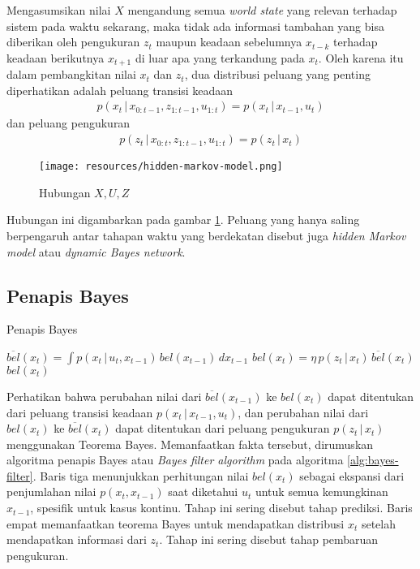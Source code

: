 Mengasumsikan nilai $X$ mengandung semua \textit{world state} yang relevan terhadap sistem pada waktu sekarang, maka tidak ada informasi tambahan yang bisa diberikan oleh pengukuran $z_t$ maupun keadaan sebelumnya $x_{t-k}$ terhadap keadaan berikutnya $x_{t+1}$ di luar apa yang terkandung pada $x_t$. Oleh karena itu dalam pembangkitan nilai $x_t$ dan $z_t$, dua distribusi peluang yang penting diperhatikan adalah peluang transisi keadaan
\begin{align}
    p(x_t \,|\, x_{0:t-1}, z_{1:t-1}, u_{1:t}) = p(x_t \,|\, x_{t-1}, u_t)
\end{align}
dan peluang pengukuran
\begin{align}
    p(z_t \,|\, x_{0:t}, z_{1:t-1}, u_{1:t}) = p(z_t \,|\, x_t)
\end{align}

\begin{figure}[h]
    \centering
    \texttt{[image: resources/hidden-markov-model.png]}
    \caption{Hubungan $X, U, Z$}
    \label{fig:hidden-markov-model}
\end{figure}

Hubungan ini digambarkan pada gambar \ref{fig:hidden-markov-model}. Peluang yang hanya saling berpengaruh antar tahapan waktu yang berdekatan disebut juga \textit{hidden Markov model} atau \textit{dynamic Bayes network}.

\subsection{Penapis Bayes}

\begin{algorithm}
    \caption{Penapis Bayes}
    \label{alg:bayes-filter}
    \begin{algorithmic}[1]
        \State $\overline{bel}(x_t) = \int p(x_t \,|\, u_t, x_{t-1})\, bel(x_{t-1})\, dx_{t-1}$
        \State $bel(x_t) = \eta\, p(z_t \,|\, x_t)\, \overline{bel}(x_t)$ 
        \EndFor
        \State \Return $bel(x_t)$
        \EndFunction
    \end{algorithmic}
\end{algorithm}

Perhatikan bahwa perubahan nilai dari $\overline{bel}(x_{t-1})$ ke $bel(x_t)$ dapat ditentukan dari peluang transisi keadaan $p(x_t \,|\, x_{t-1}, u_t)$, dan perubahan nilai dari $bel(x_t)$ ke $\overline{bel}(x_t)$ dapat ditentukan dari peluang pengukuran $p(z_t \,|\, x_t)$ menggunakan Teorema Bayes. Memanfaatkan fakta tersebut, dirumuskan algoritma penapis Bayes atau \textit{Bayes filter algorithm} pada algoritma \ref{alg:bayes-filter}. Baris tiga menunjukkan perhitungan nilai $bel(x_t)$ sebagai ekspansi dari penjumlahan nilai $p(x_t, x_{t-1})$ saat diketahui $u_t$ untuk semua kemungkinan $x_{t-1}$, spesifik untuk kasus kontinu. Tahap ini sering disebut tahap prediksi. Baris empat memanfaatkan teorema Bayes untuk mendapatkan distribusi $x_t$ setelah mendapatkan informasi dari $z_t$. Tahap ini sering disebut tahap pembaruan pengukuran.

